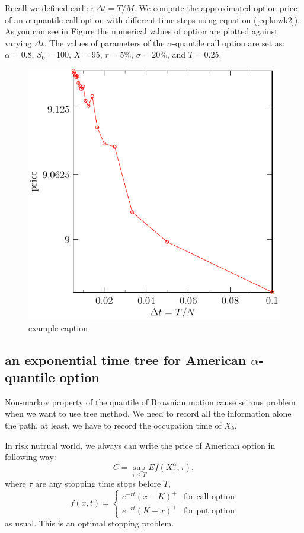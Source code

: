 \documentclass[11pt]{book}
\begin{document}
Recall we defined earlier $\Delta t = T / M$. We compute the approximated option price of an $\alpha$-quantile call option with different time steps using equation (\ref{eq:kowk2}). As you can see in Figure %
the numerical values of option are plotted against varying $\Delta t$. The values of parameters of the $\alpha$-quantile call option are set as: $ \alpha = 0.8$, $S_0 = 100$, $X = 95$, $r = 5\%$, $\sigma = 20\%$, and $T = 0.25$.
\begin{figure}[htbp]
   \centering
   \includegraphics{bfsg.pdf} %
   \caption{example caption}
   \label{fig:2}
\end{figure}


\subsection{ an exponential time tree for American $\alpha$-quantile option}
Non-markov property of  the quantile of Brownian motion cause seirous problem 
when we want to use tree method. We need to record all the information alone the
path, at least, we have to record the occupation time of $X_k$.
 
In risk nutrual world, we always can write the price of 
American option in following way:
\[
C = \sup_{\tau\leq T} Ef(X_\tau^\alpha,\tau),
\]
where $\tau$ are any stopping time stops before $T$, 
\[
f(x,t) = 
\begin{cases}
e^{-rt}(x-K)^+ & \text{for call option}\\
e^{-rt}(K-x)^+ & \text{for put option}
\end{cases}
\]
as usual.
This is an optimal stopping problem. 
\end{document}
